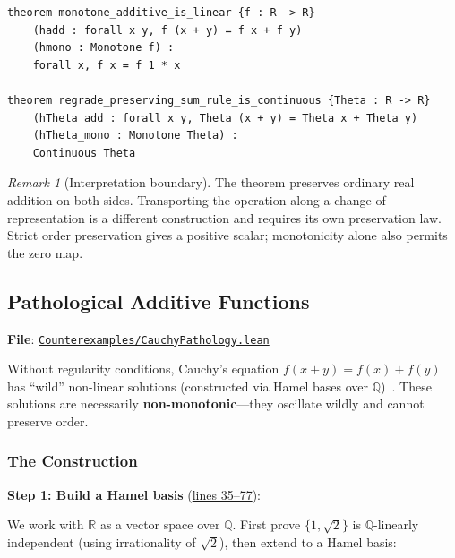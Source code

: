 \documentclass[11pt]{article}
\theoremstyle{definition}
\theoremstyle{remark}
\newtheorem{remark}[theorem]{Remark}
\begin{document}
\begin{lstlisting}[caption={Monotone additive functions are linear (\href{https://github.com/zariuq/ks-foundations-of-inference/blob/main/KnuthSkilling/Counterexamples/RegradeCounterexample.lean}{RegradeCounterexample.lean})},numbers=none]
theorem monotone_additive_is_linear {f : R -> R}
    (hadd : forall x y, f (x + y) = f x + f y)
    (hmono : Monotone f) :
    forall x, f x = f 1 * x

theorem regrade_preserving_sum_rule_is_continuous {Theta : R -> R}
    (hTheta_add : forall x y, Theta (x + y) = Theta x + Theta y)
    (hTheta_mono : Monotone Theta) :
    Continuous Theta
\end{lstlisting}

\begin{remark}[Interpretation boundary]
The theorem preserves ordinary real addition on both sides. Transporting the
operation along a change of representation is a different construction and
requires its own preservation law. Strict order preservation gives a positive
scalar; monotonicity alone also permits the zero map.
\end{remark}

\subsection{Pathological Additive Functions}

\textbf{File}: \href{https://github.com/zariuq/ks-foundations-of-inference/blob/main/KnuthSkilling/Counterexamples/CauchyPathology.lean}{\texttt{Counterexamples/CauchyPathology.lean}}

Without regularity conditions, Cauchy's equation $f(x+y) = f(x) + f(y)$ has
``wild'' non-linear solutions (constructed via Hamel bases over $\mathbb{Q}$)~\cite{Aczel1966}.
These solutions are necessarily \textbf{non-monotonic}---they oscillate wildly
and cannot preserve order.

\subsubsection{The Construction}

\textbf{Step 1: Build a Hamel basis} (\href{https://github.com/zariuq/ks-foundations-of-inference/blob/main/KnuthSkilling/Counterexamples/CauchyPathology.lean}{lines 35--77}):

We work with $\mathbb{R}$ as a vector space over $\mathbb{Q}$. First prove $\{1, \sqrt{2}\}$ is
$\mathbb{Q}$-linearly independent (using irrationality of $\sqrt{2}$), then extend to a Hamel basis:
\end{document}
